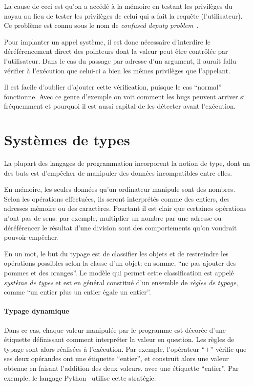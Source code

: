 La cause de ceci est qu'on a accédé à la mémoire en testant les privilèges du
noyau au lieu de tester les privilèges de celui qui a fait la requête
(l'utilisateur). Ce problème est connu sous le nom de \emph{confused deputy
problem}~\cite{hardy88confused}.

Pour implanter un appel système, il est donc nécessaire d'interdire le
déréférencement direct des pointeurs dont la valeur peut être contrôlée par
l'utilisateur. Dans le cas du passage par adresse d'un argument, il aurait fallu
vérifier à l'exécution que celui-ci a bien les mêmes privilèges que l'appelant.

Il est facile d'oublier d'ajouter cette vérification, puisque le cas
\enquote{normal} fonctionne. Avec ce genre d'exemple on voit comment les bugs
peuvent arriver si fréquemment et pourquoi il est aussi capital de les détecter
avant l'exécution.

\section{Systèmes de types}
\label{sec:types-intro}

La plupart des langages de programmation incorporent la notion de type, dont un
des buts est d'empêcher de manipuler des données incompatibles entre elles.

En mémoire, les seules données qu'un ordinateur manipule sont des nombres. Selon
les opérations effectuées, ils seront interprétés comme des entiers, des
adresses mémoire ou des caractères. Pourtant il est clair que certaines
opérations n'ont pas de sens: par exemple, multiplier un nombre par une adresse
ou déréférencer le résultat d'une division sont des comportements qu'on voudrait
pouvoir empêcher.

En un mot, le but du typage est de classifier les objets et de restreindre les
opérations possibles selon la classe d'un objet: en somme, \enquote{ne pas
ajouter des pommes et des oranges}. Le modèle qui permet cette classification
est appelé \emph{système de types} et est en général constitué d'un ensemble de
\emph{règles de typage}, comme \enquote{un entier plus un entier égale un
entier}.

\paragraph{Typage dynamique}

Dans ce cas, chaque valeur manipulée par le programme est décorée d'une
étiquette définissant comment interpréter la valeur en question. Les règles de
typage sont alors réalisées à l'exécution. Par exemple, l'opérateur
\enquote{$+$} vérifie que ses deux opérandes ont une étiquette \enquote{entier},
et construit alors une valeur obtenue en faisant l'addition des deux valeurs,
avec une étiquette \enquote{entier}. Par exemple, le langage
Python~ utilise cette stratégie.

